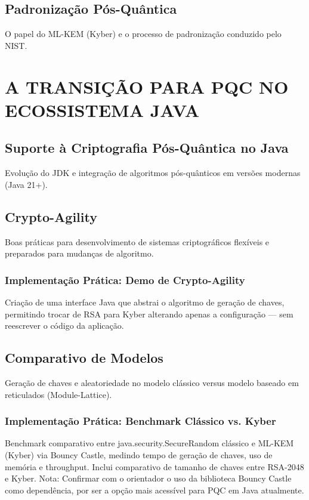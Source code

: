\documentclass[
	12pt,				%
	openright,			%
	oneside,			%
	a4paper,			%
	portuguese,			%
	brazil				%
	]{abntex2}
\begin{document}
\section{Padronização Pós-Quântica}

O papel do ML-KEM (Kyber) e o processo de padronização conduzido pelo NIST.

\chapter{A TRANSIÇÃO PARA PQC NO ECOSSISTEMA JAVA} %

\section{Suporte à Criptografia Pós-Quântica no Java}

Evolução do JDK e integração de algoritmos pós-quânticos em versões modernas (Java 21+).

\section{Crypto-Agility}

Boas práticas para desenvolvimento de sistemas criptográficos flexíveis e preparados para mudanças de algoritmo.

\subsection{Implementação Prática: Demo de Crypto-Agility}

Criação de uma interface Java que abstrai o algoritmo de geração de chaves, permitindo trocar de RSA para Kyber alterando apenas a configuração — sem reescrever o código da aplicação.

\section{Comparativo de Modelos}

Geração de chaves e aleatoriedade no modelo clássico versus modelo baseado em reticulados (Module-Lattice).

\subsection{Implementação Prática: Benchmark Clássico vs. Kyber}

Benchmark comparativo entre java.security.SecureRandom clássico e ML-KEM (Kyber) via Bouncy Castle, medindo tempo de geração de chaves, uso de memória e throughput. 
Inclui comparativo de tamanho de chaves entre RSA-2048 e Kyber.
Nota: Confirmar com o orientador o uso da biblioteca Bouncy Castle como dependência, por ser a opção mais acessível para PQC em Java atualmente.
\end{document}
